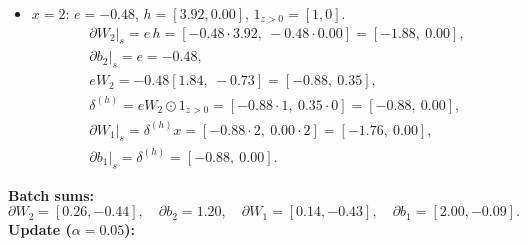 \documentclass[11pt]{article}
\begin{document}
\begin{itemize}
\begin{align*}
&\partial b_2\big|_s = e = 1.03,\\
&eW_2 = 1.03[1.84,\ -0.73] = [1.90,\ -0.75],\\
&\delta^{(h)} = eW_2 \odot 1_{z>0} = [1.90\cdot1,\ -0.75\cdot0] = [1.90,\ 0.00],\\
&\partial W_1\big|_s = \delta^{(h)} x = [1.90\cdot1,\ 0.00\cdot1] = [1.90,\ 0.00],\\
&\partial b_1\big|_s = \delta^{(h)} = [1.90,\ 0.00].
\end{align*}
\item $x=2$: $e=-0.48$, $h=[3.92, 0.00]$, $1_{z>0}=[1,0]$.
\begin{align*}
&\partial W_2\big|_s = e\,h = [-0.48\cdot3.92,\ -0.48\cdot0.00] = [-1.88,\ 0.00],\\
&\partial b_2\big|_s = e = -0.48,\\
&eW_2 = -0.48[1.84,\ -0.73] = [-0.88,\ 0.35],\\
&\delta^{(h)} = eW_2 \odot 1_{z>0} = [-0.88\cdot1,\ 0.35\cdot0] = [-0.88,\ 0.00],\\
&\partial W_1\big|_s = \delta^{(h)} x = [-0.88\cdot2,\ 0.00\cdot2] = [-1.76,\ 0.00],\\
&\partial b_1\big|_s = \delta^{(h)} = [-0.88,\ 0.00].
\end{align*}
\end{itemize}
\noindent\textbf{Batch sums:}
\[
\partial W_2=[0.26, -0.44],\quad \partial b_2=1.20,\quad \partial W_1=[0.14, -0.43],\quad \partial b_1=[2.00, -0.09].
\]
\noindent\textbf{Update ($\alpha=0.05$):}
\end{document}
